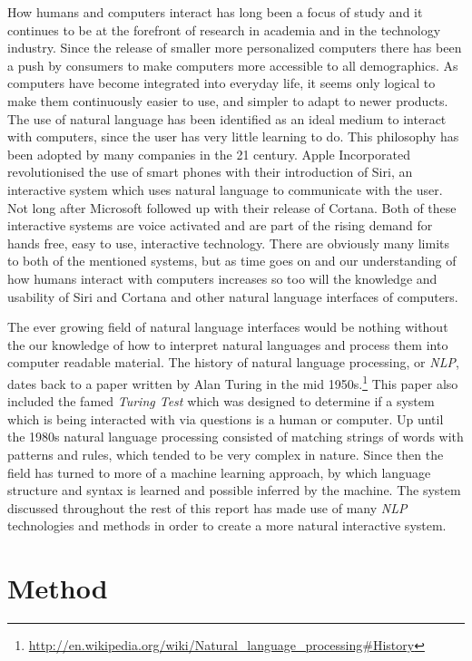 \documentclass[12pt]{article}
\begin{document}
How humans and computers interact has long been a focus of study\cite{biermann} and it continues to be at the forefront of research in academia and in the technology industry. Since the release of smaller more personalized computers there has been a push by consumers to make computers more accessible to all demographics. As computers have become integrated into everyday life, it seems only logical to make them continuously easier to use, and simpler to adapt to  newer products. The use of natural language has been identified as an ideal medium to interact with computers, since the user has very little learning to do.\cite{kelly}\cite{aggarwal}\cite{ogden} This philosophy has been adopted by many companies in the 21 century. Apple Incorporated revolutionised the use of smart phones with their introduction of Siri, an interactive system which uses natural language to communicate with the user. Not long after Microsoft followed up with their release of Cortana. Both of these interactive systems are voice activated and are part of the rising demand for hands free, easy to use, interactive technology. There are obviously many limits to both of the mentioned systems, but as time goes on and our understanding of how humans interact with computers increases so too will the knowledge and usability of Siri and Cortana and other natural language interfaces of computers.\cite{thompson}


The ever growing field of natural language interfaces would be nothing without the our knowledge of how to interpret natural languages and process them into computer readable material. The history of natural language processing, or {\it NLP}, dates back to a paper written by Alan Turing in the mid 1950s.\footnote{\url{http://en.wikipedia.org/wiki/Natural_language_processing#History}} This paper also included the famed {\it Turing Test} which was designed to determine if a system which is being interacted with via questions is a human or computer. Up until the 1980s natural language processing consisted of matching strings of words with patterns and rules, which tended to be very complex in nature. Since then the field has turned to more of a machine learning approach, by which language structure and syntax is learned and possible inferred by the machine.\cite{socher} The system discussed throughout the rest of this report has made use of many {\it NLP} technologies and methods in order to create a more natural interactive system.

\section{Method}
\label{method}
\end{document}
